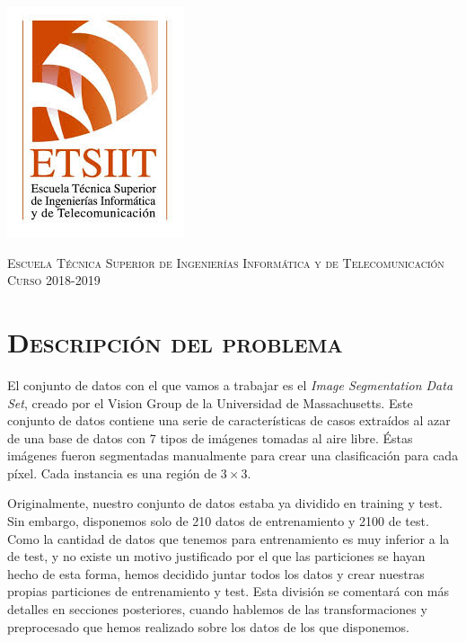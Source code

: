 \documentclass[11pt,a4paper]{article}
\begin{document}
\begin{titlepage}
\begin{minipage}{\textwidth}
\includegraphics[scale=0.3]{img/etsiit.jpeg}

\vspace{0.7cm}
\textsc{Escuela Técnica Superior de Ingenierías Informática y de Telecomunicación}\\
\vspace{1cm}
\textsc{Curso 2018-2019}
\end{minipage}
\end{titlepage}

\tableofcontents
\thispagestyle{empty}				%


\newpage

\setlength{\parskip}{1em}

\section{\textsc{Descripción del problema}}

El conjunto de datos con el que vamos a trabajar es el \textit{Image Segmentation Data Set}, creado por el Vision Group de
la Universidad de Massachusetts. Este conjunto de datos contiene una serie de características de casos extraídos al azar
de una base de datos con 7 tipos de imágenes tomadas al aire libre. Éstas imágenes fueron segmentadas manualmente para
crear una clasificación para cada píxel. Cada instancia es una región de $3 \times 3$.

Originalmente, nuestro conjunto de datos estaba ya dividido en training y test. Sin embargo, disponemos solo de 210 datos
de entrenamiento y 2100 de test. Como la cantidad de datos que tenemos para entrenamiento es muy inferior a la de test, y
no existe un motivo justificado por el que las particiones se hayan hecho de esta forma, hemos decidido juntar todos los
datos y crear nuestras propias particiones de entrenamiento y test. Esta división se comentará con más detalles en
secciones posteriores, cuando hablemos de las transformaciones y preprocesado que hemos realizado sobre los datos de los
que disponemos. 
\end{document}

